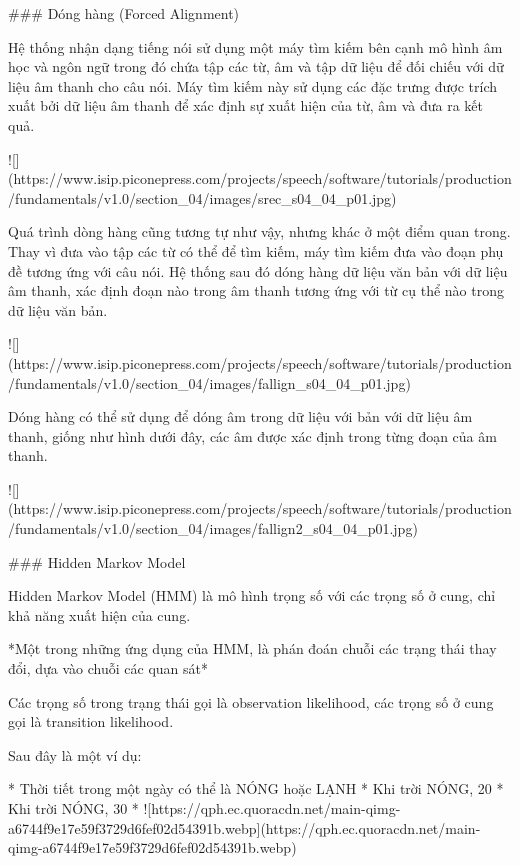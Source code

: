 ### Dóng hàng (Forced Alignment)

Hệ thống nhận dạng tiếng nói sử dụng một máy tìm kiếm bên cạnh mô hình âm học và ngôn ngữ trong đó chứa tập các từ, âm và tập dữ liệu để đối chiếu với dữ liệu âm thanh cho câu nói. Máy tìm kiếm này sử dụng các đặc trưng được trích xuất bởi dữ liệu âm thanh để xác định sự xuất hiện của từ, âm và đưa ra kết quả.

![](https://www.isip.piconepress.com/projects/speech/software/tutorials/production/fundamentals/v1.0/section_04/images/srec_s04_04_p01.jpg)

Quá trình dòng hàng cũng tương tự như vậy, nhưng khác ở một điểm quan trong. Thay vì đưa vào tập các từ có thể để tìm kiếm, máy tìm kiếm đưa vào đoạn phụ đề tương ứng với câu nói. Hệ thống sau đó dóng hàng dữ liệu văn bản với dữ liệu âm thanh, xác định đoạn nào trong âm thanh tương ứng với từ cụ thể nào trong dữ liệu văn bản.

![](https://www.isip.piconepress.com/projects/speech/software/tutorials/production/fundamentals/v1.0/section_04/images/fallign_s04_04_p01.jpg)

Dóng hàng có thể sử dụng để dóng âm trong dữ liệu với bản với dữ liệu âm thanh, giống như hình dưới đây, các âm được xác định trong từng đoạn của âm thanh.

![](https://www.isip.piconepress.com/projects/speech/software/tutorials/production/fundamentals/v1.0/section_04/images/fallign2_s04_04_p01.jpg)


### Hidden Markov Model

Hidden Markov Model (HMM) là mô hình trọng số với các trọng số ở cung, chỉ khả năng xuất hiện của cung.

*Một trong những ứng dụng của HMM, là phán đoán chuỗi các trạng thái thay đổi, dựa vào chuỗi các quan sát*

Các trọng số trong trạng thái gọi là observation likelihood, các trọng số ở cung gọi là transition likelihood.

Sau đây là một ví dụ:

* Thời tiết trong một ngày có thể là NÓNG hoặc LẠNH
* Khi trời NÓNG, 20%
* Khi trời NÓNG, 30%
* ![https://qph.ec.quoracdn.net/main-qimg-a6744f9e17e59f3729d6fef02d54391b.webp](https://qph.ec.quoracdn.net/main-qimg-a6744f9e17e59f3729d6fef02d54391b.webp)

